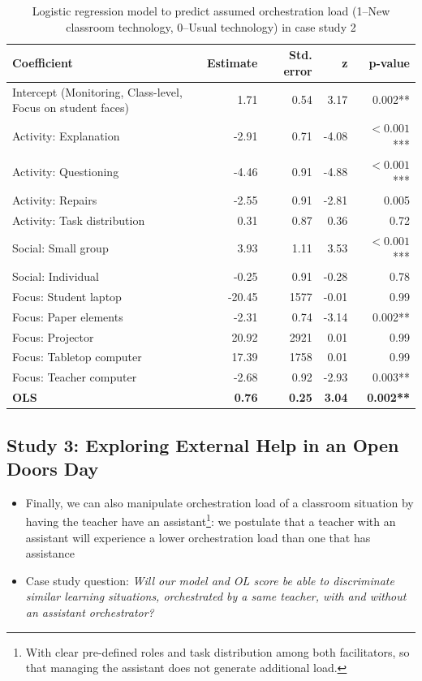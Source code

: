 \documentclass[10pt,journal,compsoc]{IEEEtran}
\begin{document}
\begin{table}[!t]
\caption{Logistic regression model to predict assumed orchestration load (1--New classroom technology, 0--Usual technology) in case study 2}
\label{tab:case2results}
\centering
\begin{tabular}{|p{2.8cm}||r|r|r|r|}
\hline
Coefficient & Estimate & Std. error & z & p-value\\
\hline
\hline
Intercept (Monitoring, Class-level, Focus on student faces) & 1.71 & 0.54 & 3.17 & 0.002** \\
Activity: Explanation & -2.91 & 0.71 & -4.08 & $<0.001$*** \\
Activity: Questioning & -4.46 & 0.91 & -4.88 & $<0.001$*** \\
Activity: Repairs & -2.55 & 0.91 & -2.81 & 0.005 \\
Activity: Task distribution & 0.31 & 0.87 & 0.36 & 0.72 \\
Social: Small group & 3.93 & 1.11 & 3.53 & $<0.001$*** \\
Social: Individual & -0.25 & 0.91 & -0.28 & 0.78 \\
Focus: Student laptop & -20.45 & 1577 & -0.01 & 0.99 \\
Focus: Paper elements & -2.31 & 0.74 & -3.14 & 0.002** \\
Focus: Projector & 20.92 & 2921 & 0.01 & 0.99 \\
Focus: Tabletop computer & 17.39 & 1758 & 0.01 & 0.99 \\
Focus: Teacher computer & -2.68 & 0.92 & -2.93 & 0.003** \\
\textbf{OLS} & \textbf{0.76} & \textbf{0.25} & \textbf{3.04} & \textbf{0.002**} \\
\hline
\end{tabular}
\end{table}


\subsection{Study 3: Exploring External Help in an Open Doors Day}

\begin{itemize}
\item Finally, we can also manipulate orchestration load of a classroom situation by having the teacher have an assistant\footnote{With clear pre-defined roles and task distribution among both facilitators, so that managing the assistant does not generate additional load.}: we postulate that a teacher with an assistant will experience a lower orchestration load than one that has assistance
\item Case study question: \textit{Will our model and OL score be able to discriminate similar learning situations, orchestrated by a same teacher, with and without an assistant orchestrator?}
\end{itemize}
\end{document}
